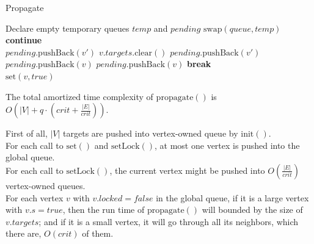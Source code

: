 \documentclass[12pt]{report}
\begin{document}
\begin{algorithm}[H]
\caption{Propagate}
\begin{algorithmic}
\State Declare empty temporary queues $ \mathit{temp} $ and $ \mathit{pending} $
\State $ \mathrm{swap}(\mathit{queue}, \mathit{temp}) $
		\State \textbf{continue}
	\EndIf
	\\
				\State $ \mathit{pending}.\mathrm{pushBack}(v') $
			\EndFor
			\State $ v.\mathit{targets}.\mathrm{clear}() $
		\Else
				\State $ \mathit{pending}.\mathrm{pushBack}(v') $
			\EndFor
		\EndIf
	\Else
				\State $ \mathit{pending}.\mathrm{pushBack}(v) $
			\EndIf
		\Else
					\State $ \mathit{pending}.\mathrm{pushBack}(v) $
					\State \textbf{break}
				\EndIf
			\EndFor
		\EndIf
	\EndIf
\EndFor
\\
	\State $ \mathrm{set}(v, \textit{true}) $
\EndFor
\end{algorithmic}
\end{algorithm}

\begin{Lemma}
The total amortized time complexity of $ \mathrm{propagate}() $ is $ O\left(\lvert V \rvert + q \cdot \left(\mathit{crit} + \frac{\lvert E \rvert}{\mathit{crit}} \right) \right) $.
\end{Lemma}
\begin{Proof}
First of all, $ \lvert V \rvert $ targets are pushed into vertex-owned queue by $ \mathrm{init}() $. \\
For each call to $ \mathrm{set}() $ and $ \mathrm{setLock}() $, at most one vertex is pushed into the global queue. \\
For each call to $ \mathrm{setLock}() $, the current vertex might be pushed into $ O(\frac{\lvert E \rvert}{\mathit{crit}}) $ vertex-owned queues. \\
For each vertex $ v $ with $ v.\mathit{locked} = \mathit{false} $ in the global queue,
if it is a large vertex with $ v.s = \mathit{true} $, then the run time of $ \mathrm{propagate}() $ will bounded by the size of $ v.\mathit{targets} $;
and if it is a small vertex, it will go through all its neighbors, which there are, $ O(\mathit{crit}) $ of them.
\end{Proof}
\end{document}
